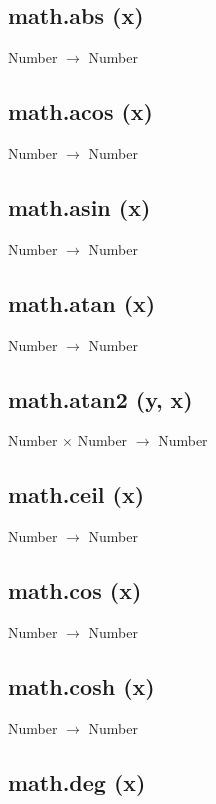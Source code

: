 \documentclass[12pt]{article}
\begin{document}
\subsection{math.abs (x)}

Number $\rightarrow$ Number

\subsection{math.acos (x)}

Number $\rightarrow$ Number

\subsection{math.asin (x)}

Number $\rightarrow$ Number

\subsection{math.atan (x)}

Number $\rightarrow$ Number

\subsection{math.atan2 (y, x)}

Number $\times$ Number $\rightarrow$ Number

\subsection{math.ceil (x)}

Number $\rightarrow$ Number

\subsection{math.cos (x)}

Number $\rightarrow$ Number

\subsection{math.cosh (x)}

Number $\rightarrow$ Number

\subsection{math.deg (x)}
\end{document}
